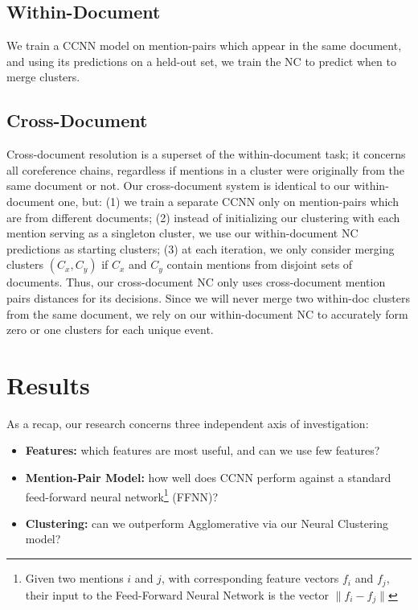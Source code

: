 \documentclass[11pt,a4paper]{article}
\begin{document}
\subsection{Within-Document}
We train a CCNN model on mention-pairs which appear in the same document, and using its predictions on a held-out set, we train the NC to predict when to merge clusters.

\subsection{Cross-Document}
Cross-document resolution is a superset of the within-document task; it concerns all coreference chains, regardless if mentions in a cluster were originally from the same document or not.  Our cross-document system is identical to our within-document one, but: (1) we train a separate CCNN only on mention-pairs which are from different documents; (2) instead of initializing our clustering with each mention serving as a singleton cluster, we use our within-document NC predictions as starting clusters; (3) at each iteration, we only consider merging clusters $(C_x,C_y)$ if $C_x$ and $C_y$ contain mentions from disjoint sets of documents.  Thus, our cross-document NC only uses cross-document mention pairs distances for its decisions. Since we will never merge two within-doc clusters from the same document, we rely on our within-document NC to accurately form zero or one clusters for each unique event.

\section{Results}
As a recap, our research concerns three independent axis of investigation:
\begin{itemize}
\item \textbf{Features:} which features are most useful, and can we use few features?
\item \textbf{Mention-Pair Model:} how well does CCNN perform against a standard feed-forward neural network\footnote{Given two mentions $i$ and $j$, with corresponding feature vectors $f_i$ and $f_j$, their input to the Feed-Forward Neural Network is the vector $\|f_{i} - f_{j}\|$} (FFNN)?
\item \textbf{Clustering:} can we outperform Agglomerative via our Neural Clustering model?
\end{itemize}
\end{document}
